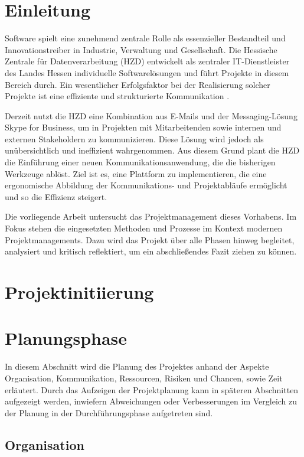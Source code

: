 \documentclass[12pt,oneside]{article}
\begin{document}
\section{Einleitung}
Software spielt eine zunehmend zentrale Rolle als essenzieller Bestandteil und Innovationstreiber in Industrie, Verwaltung und Gesellschaft. Die Hessische Zentrale für Datenverarbeitung (HZD) entwickelt als zentraler IT-Dienstleister des Landes Hessen individuelle Softwarelösungen und führt Projekte in diesem Bereich durch. Ein wesentlicher Erfolgsfaktor bei der Realisierung solcher Projekte ist eine effiziente und strukturierte Kommunikation \cite{pikkarainen_impact_2008}. 

Derzeit nutzt die HZD eine Kombination aus E-Mails und der Messaging-Lösung Skype for Business, um in Projekten mit Mitarbeitenden sowie internen und externen Stakeholdern zu kommunizieren. Diese Lösung wird jedoch als unübersichtlich und ineffizient wahrgenommen. Aus diesem Grund plant die HZD die Einführung einer neuen Kommunikationsanwendung, die die bisherigen Werkzeuge ablöst. Ziel ist es, eine Plattform zu implementieren, die eine ergonomische Abbildung der Kommunikations- und Projektabläufe ermöglicht und so die Effizienz steigert.

Die vorliegende Arbeit untersucht das Projektmanagement dieses Vorhabens. Im Fokus stehen die eingesetzten Methoden und Prozesse im Kontext modernen Projektmanagements. Dazu wird das Projekt über alle Phasen hinweg begleitet, analysiert und kritisch reflektiert, um ein abschließendes Fazit ziehen zu können.


\section{Projektinitiierung}


\section{Planungsphase}
In diesem Abschnitt wird die Planung des Projektes anhand der Aspekte Organisation, Kommunikation, Ressourcen, Risiken und Chancen, sowie Zeit erläutert.
Durch das Aufzeigen der Projektplanung kann in späteren Abschnitten aufgezeigt werden, inwiefern Abweichungen oder Verbesserungen im Vergleich 
zu der Planung in der Durchführungsphase aufgetreten sind.

\subsection{Organisation}
\end{document}

